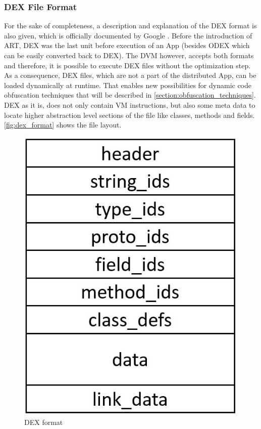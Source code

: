 \subsubsection{DEX File Format}
\label{section:dex_file_format}
For the sake of completeness, a description and explanation of the DEX format is also given,
which is officially documented by Google \parencite{dex}.
Before the introduction of ART, DEX was the last unit before
execution of an App (besides ODEX which can be easily converted back to DEX). The DVM however, accepts both formats and therefore, it is possible to execute
DEX files without the optimization step. As a consequence, DEX files, which are not a part of the distributed App, can be loaded dynamically at runtime. That enables new possibilities for dynamic code obfuscation techniques that will be described in \autoref{section:obfuscation_techniques}.
DEX as it is, does not only contain
VM instructions, but also some meta data to locate
higher abstraction level sections of the file like classes,
methods and fields.
\autoref{fig:dex_format} shows the file layout.
\begin{figure}[htb]
  \centering
  \includegraphics[scale=0.3]{figures/dex_format}
  \caption[DEX format]{DEX format}
  \label{fig:dex_format}
\end{figure}
